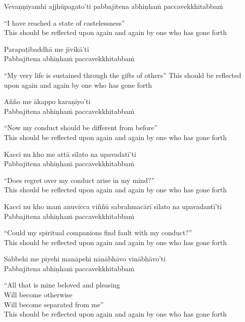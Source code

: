 Vevaṇṇiyamhi ajjhūpagato'ti pabbajitena abhiṇhaṁ paccavekkhitabbaṁ

\begin{english}
  “I have reached a state of castelessness”\\
  This should be reflected upon again and again by one who has gone forth
\end{english}

Parapaṭibaddhā me jīvikā’ti\\
Pabbajitena abhiṇhaṁ paccavekkhitabbaṁ

\begin{english}
  “My very life is sustained through the gifts of others”
  This should be reflected upon again and again by one who has gone forth
\end{english}

Añño me ākappo karaṇīyo'ti\\
Pabbajitena abhiṇhaṁ paccavekkhitabbaṁ

\begin{english}
  “Now my conduct should be different from before”\\
  This should be reflected upon again and again by one who has gone forth
\end{english}

Kacci nu kho me attā sīlato na upavadatī'ti\\
Pabbajitena abhiṇhaṁ paccavekkhitabbaṁ

\begin{english}
  “Does regret over my conduct arise in my mind?”\\
  This should be reflected upon again and again by one who has gone forth
\end{english}

Kacci nu kho maṁ anuvicca viññū sabrahmacārī sīlato na upavadantī'ti\\
Pabbajitena abhiṇhaṁ paccavekkhitabbaṁ

\begin{english}
  “Could my spiritual companions find fault with my conduct?”\\
  This should be reflected upon again and again by one who has gone forth
\end{english}

Sabbehi me piyehi manāpehi nānābhāvo vinābhāvo'ti\\
Pabbajitena abhiṇhaṁ paccavekkhitabbaṁ

\begin{english}
  “All that is mine beloved and pleasing\\
  Will become otherwise\\
  Will become separated from me”\\
  This should be reflected upon again and again by one who has gone forth
\end{english}

